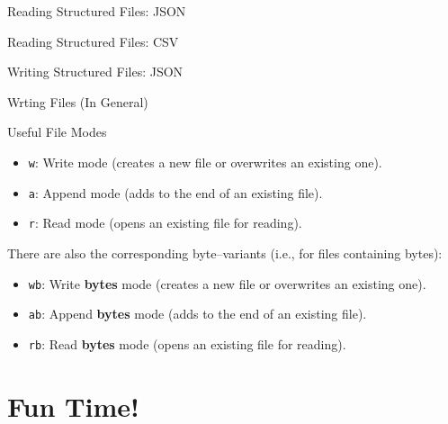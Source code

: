\documentclass[aspectratio=169, 12pt, xcolor=table]{beamer}
\newcounter{exno}
\begin{document}
	\begin{frame}{Reading Structured Files: JSON}
		
	\end{frame}

	\begin{frame}{Reading Structured Files: CSV}
		
	\end{frame}

	\begin{frame}{Writing Structured Files: JSON}
		
	\end{frame}

	\begin{frame}{Wrting Files (In General)}
		
	\end{frame}

	\begin{frame}{Useful File Modes}
		\begin{itemize}
			\item \texttt{w}: Write mode (creates a new file or overwrites an existing one).
			\item \texttt{a}: Append mode (adds to the end of an existing file).
			\item \texttt{r}: Read mode (opens an existing file for reading).
		\end{itemize}
		There are also the corresponding byte--variants (i.e., for files containing bytes):
		\begin{itemize}
			\item \texttt{wb}: Write \textbf{bytes} mode (creates a new file or overwrites an existing one).
			\item \texttt{ab}: Append \textbf{bytes} mode (adds to the end of an existing file).
			\item \texttt{rb}: Read \textbf{bytes} mode (opens an existing file for reading).
		\end{itemize}
	\end{frame}
	
	\section{Fun Time!}\label{sec:fun-time}
	
	\sectionframe
	
	\setcounter{exno}{0}
	
\end{document}
